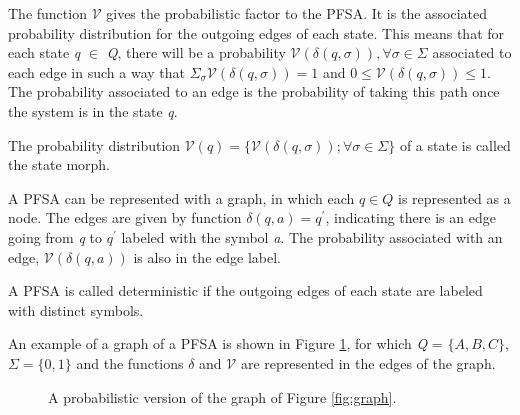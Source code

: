 {The function $\mathcal{V}$ gives the probabilistic factor to the PFSA. It is the associated probability distribution for the outgoing edges of each state. This means that for each state \textit{q} $\in$ \textit{Q}, there will be a probability $\mathcal{V}(\delta(q, \sigma)), \forall \sigma \in \Sigma$ associated to each edge in such a way that $\Sigma_{\sigma}\mathcal{V}(\delta(q,\sigma)) = 1$ and $0 \leq \mathcal{V}(\delta(q,\sigma)) \leq 1$. The probability associated to an edge is the probability of taking this path once the system is in the state \textit{q}. 

\begin{definition}\label{definition:morph}
The probability distribution $\mathcal{V}(q) = \{ \mathcal{V}(\delta(q, \sigma)); \forall \sigma \in \Sigma\}$ of a state is called the state morph.  
\end{definition}

A PFSA can be represented with a graph, in which each $q \in Q$ is represented as a node. The edges are given by function $\delta(q, a) =  q^{\prime}$, indicating there is an edge going from \textit{q} to \textit{$q^{\prime}$} labeled with the symbol \textit{a}. The probability associated with an edge, $\mathcal{V}(\delta(q,a))$ is also in the edge label.

\begin{definition}\label{definition:dpfsa}
A PFSA is called deterministic if the outgoing edges of each state are labeled with distinct symbols. 
\end{definition}

An example of a graph of a PFSA is shown in Figure \ref{fig:pfsa}, for which \textit{Q} = $\{A, B, C\}$, $\Sigma = \{0, 1\}$ and the functions $\delta$ and $\mathcal{V}$ are represented in the edges of the graph.

\begin{figure}
\centering
{}
\caption{A probabilistic version of the graph of Figure \ref{fig:graph}.\label{fig:pfsa}}
\end{figure}

}
